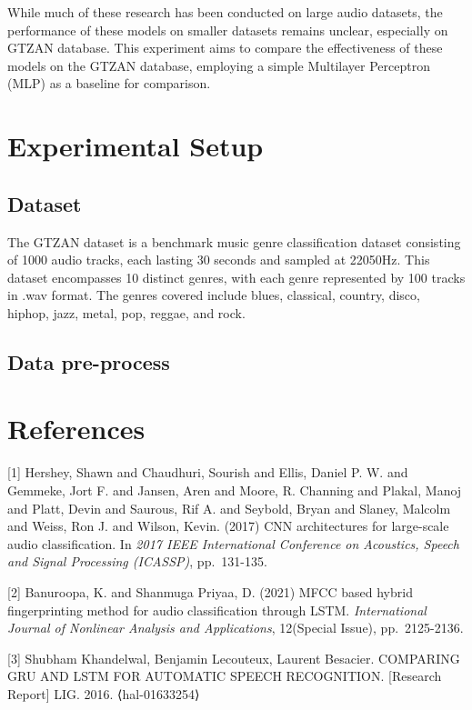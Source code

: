 \documentclass{article}
\begin{document}
While much of these research has been conducted on large audio datasets, the performance of these models on smaller datasets remains unclear, especially on GTZAN database. 
This experiment aims to compare the effectiveness of these models on the GTZAN database, employing a simple Multilayer Perceptron (MLP) as a baseline for comparison.

\section{Experimental Setup}
\subsection{Dataset}
The GTZAN dataset is a benchmark music genre classification dataset consisting of 1000 audio tracks, each lasting 30 seconds and sampled at 22050Hz. 
This dataset encompasses 10 distinct genres, with each genre represented by 100 tracks in .wav format. 
The genres covered include blues, classical, country, disco, hiphop, jazz, metal, pop, reggae, and rock.
\subsection{Data pre-process}




\section*{References}
[1] Hershey, Shawn and Chaudhuri, Sourish and Ellis, Daniel P. W. and Gemmeke, Jort F. and Jansen, Aren and Moore, R. Channing and Plakal, Manoj and Platt, Devin and Saurous, Rif A. and Seybold, Bryan and Slaney, Malcolm and Weiss, Ron J. and Wilson, Kevin. (2017) CNN architectures for large-scale audio classification. In {\it 2017 IEEE International Conference on Acoustics, Speech and Signal Processing (ICASSP)}, pp.\ 131-135.

[2] Banuroopa, K. and Shanmuga Priyaa, D. (2021) MFCC based hybrid fingerprinting method for audio classification through LSTM. {\it International Journal of Nonlinear Analysis and Applications}, 12(Special Issue), pp.\ 2125-2136.

[3] Shubham Khandelwal, Benjamin Lecouteux, Laurent Besacier. COMPARING GRU AND LSTM FOR AUTOMATIC SPEECH RECOGNITION. [Research Report] LIG. 2016. ⟨hal-01633254⟩
\end{document}
